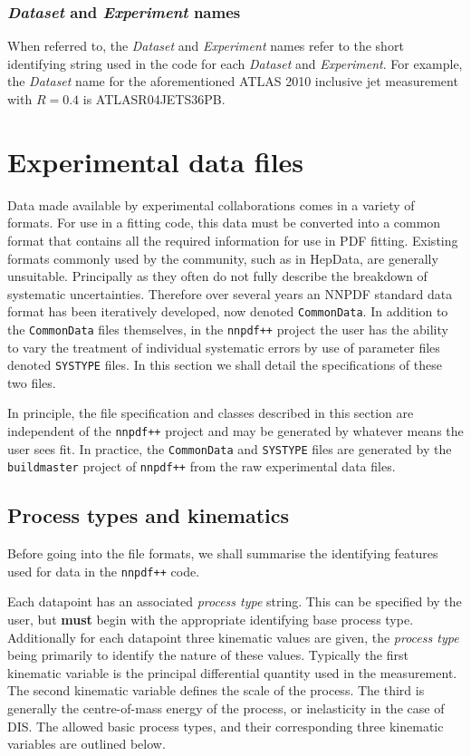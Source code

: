 \documentclass[11pt]{article}
\begin{document}
\subsubsection*{\emph{Dataset} and \emph{Experiment} names}
When referred to, the \emph{Dataset} and \emph{Experiment} names refer to the short identifying string used in the code for each \emph{Dataset} and \emph{Experiment}.
For example, the \emph{Dataset} name for the aforementioned ATLAS 2010 inclusive jet measurement with $R=0.4$ is \mbox{ATLASR04JETS36PB}.

\section{Experimental data files}\label{sec:experimental}
Data made available by experimental collaborations comes in a variety of formats. For use in a fitting code, this data must be converted into a common format
that contains all the required information for use in PDF fitting. Existing formats commonly used by the community, such as in HepData, are generally unsuitable.
Principally as they often do not fully describe the breakdown of systematic uncertainties. Therefore over several years an NNPDF standard data format has been
iteratively developed, now denoted {\tt CommonData}. In addition to the {\tt CommonData} files themselves, in the {\tt nnpdf++} project the user has the ability to vary
the treatment of individual systematic errors by use of parameter files denoted {\tt SYSTYPE} files. In this section we shall detail the specifications of these two files.

In principle, the file specification and classes described in this section are independent of the {\tt nnpdf++} project and may be generated by whatever means the user sees fit.
In practice, the {\tt CommonData} and {\tt SYSTYPE} files are generated by the {\tt buildmaster} project of {\tt nnpdf++} from the raw experimental data files.

\subsection{Process types and kinematics}
Before going into the file formats, we shall summarise the identifying features used for data in the {\tt nnpdf++} code. 

Each datapoint has an associated \emph{process type} string. This can be specified by the user, but \textbf{must} begin with the appropriate identifying base process type. Additionally for each datapoint three kinematic values are given, the \emph{process type} being primarily to identify the nature of these values. Typically the first kinematic variable is the principal differential quantity used in the measurement. The second kinematic variable defines the scale of the process. The third is generally the centre-of-mass energy of the process, or inelasticity in the case of DIS. The allowed basic process types, and their corresponding three kinematic variables are outlined below.
\end{document}
